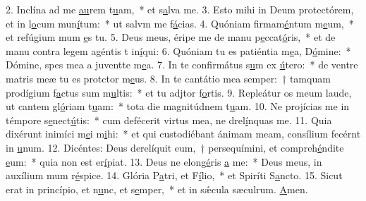 2. Inclína ad me \uline{au}rem t\uline{u}am,~* et s\uline{a}lva me.
3. Esto mihi in Deum protectórem, et in l\uline{o}cum mun\uline{í}tum:~* ut salvm me f\uline{á}cias.
4. Quóniam firmam\uline{é}ntum m\uline{e}um,~* et refúgium mum \uline{e}s tu.
5. Deus meus, éripe me de manu p\uline{e}ccat\uline{ó}ris,~* et de manu contra legem agéntis t in\uline{í}qui:
6. Quóniam tu es patiéntia m\uline{e}a, D\uline{ó}mine:~* Dómine, spes mea a juventte m\uline{e}a.
7. In te confirmátus s\uline{u}m ex \uline{ú}tero:~* de ventre matris meæ tu es protctor m\uline{e}us.
8. In te cantátio mea semper:~† tamquam prodígium f\uline{a}ctus sum m\uline{u}ltis:~* et tu adjtor f\uline{o}rtis.
9. Repleátur os meum laude, ut cantem gl\uline{ó}riam t\uline{u}am:~* tota die magnitúdnem t\uline{u}am.
10. Ne projícias me in témpore s\uline{e}nect\uline{ú}tis:~* cum defécerit virtus mea, ne drel\uline{í}nquas me.
11. Quia dixérunt inimíci m\uline{e}i m\uline{i}hi:~* et qui custodiébant ánimam meam, consílium fecérnt in \uline{u}num.
12. Dicéntes: Deus derelíquit eum,~† persequímini, et compreh\uline{é}ndite \uline{e}um:~* quia non est  er\uline{í}piat.
13. Deus ne elong\uline{é}ris \uline{a} me:~* Deus meus, in auxílium mum r\uline{é}spice.
14. Glória P\uline{a}tri, et F\uline{í}lio,~* et Spiríti S\uline{a}ncto.
15. Sicut erat in princípio, et n\uline{u}nc, et s\uline{e}mper,~* et in sǽcula sæculrum. \uline{A}men.
